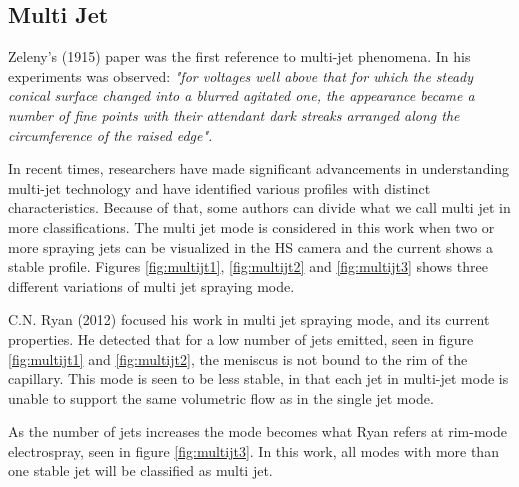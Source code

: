 \subsection{Multi Jet}
\label{subsec:Multi Jet}

Zeleny's (1915)\cite{zeleny} paper was the first reference to multi-jet phenomena. In his experiments was observed:
\emph{"for voltages well above that for which the steady conical surface changed into a blurred agitated one, the appearance became a number of fine points with their attendant dark streaks arranged along the circumference of the raised edge".}

In recent times, researchers have made significant advancements in understanding multi-jet technology and have identified various profiles with distinct characteristics. Because of that, some authors can divide what we call multi jet in more classifications.
The multi jet mode is considered in this work when two or more spraying jets can be visualized in the HS camera and the current shows a stable profile. Figures \ref{fig:multijt1}, \ref{fig:multijt2} and \ref{fig:multijt3} shows three different variations of multi jet spraying mode.

C.N. Ryan (2012)\cite{Ryan} focused his work in multi jet spraying mode, and its current properties. 
He detected that for a low number of jets emitted, seen in figure \ref{fig:multijt1} and \ref{fig:multijt2}, the meniscus is not bound to the rim of the capillary. 
This mode is seen to be less stable, in that each jet in multi-jet mode is unable to support the same volumetric flow as in the single jet mode.

As the number of jets increases the mode becomes what Ryan refers at rim-mode electrospray, seen in figure \ref{fig:multijt3}. 
In this work, all modes with more than one stable jet will be classified as multi jet.

